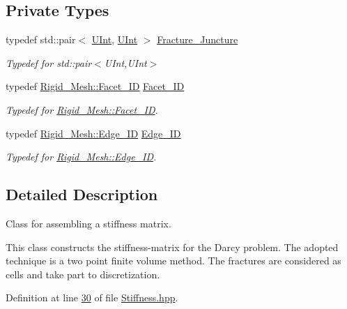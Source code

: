 \subsection*{Private Types}
\begin{DoxyCompactItemize}
\item 
typedef std\+::pair$<$ \hyperlink{namespaceFVCode3D_a4bf7e328c75d0fd504050d040ebe9eda}{U\+Int}, \hyperlink{namespaceFVCode3D_a4bf7e328c75d0fd504050d040ebe9eda}{U\+Int} $>$ \hyperlink{classFVCode3D_1_1StiffMatrix_ab6572f8976a3d7fc0d54d73888764252}{Fracture\+\_\+\+Juncture}
\begin{DoxyCompactList}\small\item\em Typedef for std\+::pair$<$\+U\+Int,\+U\+Int$>$ \end{DoxyCompactList}\item 
typedef \hyperlink{classFVCode3D_1_1Rigid__Mesh_1_1Facet__ID}{Rigid\+\_\+\+Mesh\+::\+Facet\+\_\+\+ID} \hyperlink{classFVCode3D_1_1StiffMatrix_a317efdb4e4f2da856c747d1e0b80db20}{Facet\+\_\+\+ID}
\begin{DoxyCompactList}\small\item\em Typedef for \hyperlink{classFVCode3D_1_1Rigid__Mesh_1_1Facet__ID}{Rigid\+\_\+\+Mesh\+::\+Facet\+\_\+\+ID}. \end{DoxyCompactList}\item 
typedef \hyperlink{classFVCode3D_1_1Rigid__Mesh_1_1Edge__ID}{Rigid\+\_\+\+Mesh\+::\+Edge\+\_\+\+ID} \hyperlink{classFVCode3D_1_1StiffMatrix_ac82be26370aa6eb17714078d9a2bf8df}{Edge\+\_\+\+ID}
\begin{DoxyCompactList}\small\item\em Typedef for \hyperlink{classFVCode3D_1_1Rigid__Mesh_1_1Edge__ID}{Rigid\+\_\+\+Mesh\+::\+Edge\+\_\+\+ID}. \end{DoxyCompactList}\end{DoxyCompactItemize}


\subsection{Detailed Description}
Class for assembling a stiffness matrix. 

This class constructs the stiffness-\/matrix for the Darcy problem. The adopted technique is a two point finite volume method. The fractures are considered as cells and take part to discretization. 

Definition at line \hyperlink{Stiffness_8hpp_source_l00030}{30} of file \hyperlink{Stiffness_8hpp_source}{Stiffness.\+hpp}.



